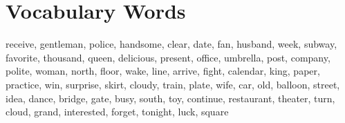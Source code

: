 \documentclass{article}
\begin{document}
\renewcommand{\familydefault}{\sfdefault}
\onehalfspacing
\fontsize{12pt}{14pt}\selectfont

\section*{Vocabulary Words}
\begin{addmargin}[1em]{1em}
receive, gentleman, police, handsome, clear, date, fan, husband, week, subway, favorite, thousand, queen, delicious, present, office, umbrella, post, company, polite, woman, north, floor, wake, line, arrive, fight, calendar, king, paper, practice, win, surprise, skirt, cloudy, train, plate, wife, car, old, balloon, street, idea, dance, bridge, gate, busy, south, toy, continue, restaurant, theater, turn, cloud, grand, interested, forget, tonight, luck, square
\end{addmargin}
\end{document}
